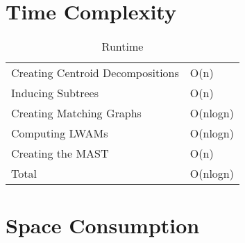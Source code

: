 \section{Time Complexity}
\begin{table}[]
	\centering
	\label{runtimeTable}
	\begin{tabular}{l|l}
		Creating Centroid Decompositions & O(n)     \\
		Inducing Subtrees                & O(n)     \\
		Creating Matching Graphs         & O(nlogn) \\
		Computing LWAMs                  & O(nlogn) \\
		Creating the MAST                & O(n)     \\ \hline
		Total                            & O(nlogn)
	\end{tabular}
	\caption{Runtime}
\end{table}

\section{Space Consumption}









